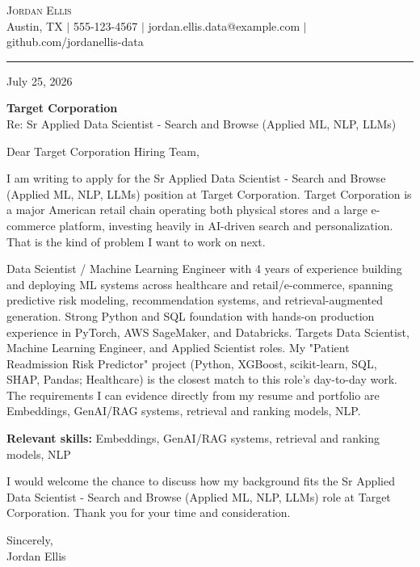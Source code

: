 \documentclass[letterpaper,11pt]{article}
\begin{document}
\begin{center}
    {\Large \scshape Jordan Ellis} \\ \vspace{2pt}
    \small Austin, TX $|$ 555-123-4567 $|$ jordan.ellis.data@example.com $|$ github.com/jordanellis-data
\end{center}
\vspace{6pt}
\hrule
\vspace{10pt}

July 25, 2026

\textbf{Target Corporation} \\
Re: Sr Applied Data Scientist - Search and Browse (Applied ML, NLP, LLMs)

\vspace{4pt}

Dear Target Corporation Hiring Team,

I am writing to apply for the Sr Applied Data Scientist - Search and Browse (Applied ML, NLP, LLMs) position at Target Corporation. Target Corporation is a major American retail chain operating both physical stores and a large e-commerce platform, investing heavily in AI-driven search and personalization. That is the kind of problem I want to work on next.

Data Scientist / Machine Learning Engineer with 4 years of experience building and deploying ML systems across healthcare and retail/e-commerce, spanning predictive risk modeling, recommendation systems, and retrieval-augmented generation. Strong Python and SQL foundation with hands-on production experience in PyTorch, AWS SageMaker, and Databricks. Targets Data Scientist, Machine Learning Engineer, and Applied Scientist roles. My "Patient Readmission Risk Predictor" project (Python, XGBoost, scikit-learn, SQL, SHAP, Pandas; Healthcare) is the closest match to this role's day-to-day work. The requirements I can evidence directly from my resume and portfolio are Embeddings, GenAI/RAG systems, retrieval and ranking models, NLP.

\textbf{Relevant skills:} Embeddings, GenAI/RAG systems, retrieval and ranking models, NLP

I would welcome the chance to discuss how my background fits the Sr Applied Data Scientist - Search and Browse (Applied ML, NLP, LLMs) role at Target Corporation. Thank you for your time and consideration.

\vspace{10pt}
Sincerely, \\
Jordan Ellis
\end{document}
